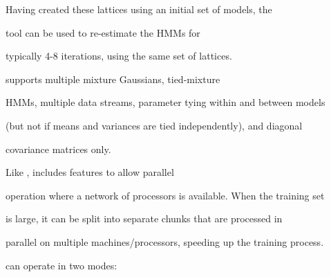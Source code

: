 Having created these lattices using an initial set of models, the


tool  can be used to re-estimate the HMMs for 


typically 4-8 iterations, using the same set of lattices.   





 supports multiple mixture Gaussians, tied-mixture


HMMs, multiple data streams, parameter tying within and between models


(but not if means and variances are tied independently), and diagonal


covariance matrices only.























Like ,  includes features to allow parallel


operation where a network of processors is available. When the training set


is large, it can be split into separate chunks that are processed in


parallel on multiple machines/processors, speeding up the training process.


 can operate in two modes:



